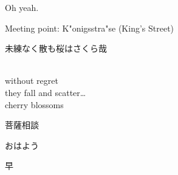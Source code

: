 Oh yeah.

\parbox{3cm}{Meeting point: K"onigsstra"se (King's Street)}


\begin{CJK}{UTF8}{min}未練なく散も桜はさくら哉\end{CJK} \\
without regret \\
they fall and scatter\ldots \\
cherry blossoms

\begin{CJK}{UTF8}{min}菩薩相談\end{CJK}
	
\begin{CJK*}{UTF8}{mj}

おはよう %

{早} %

\clearpage\end{CJK*}
